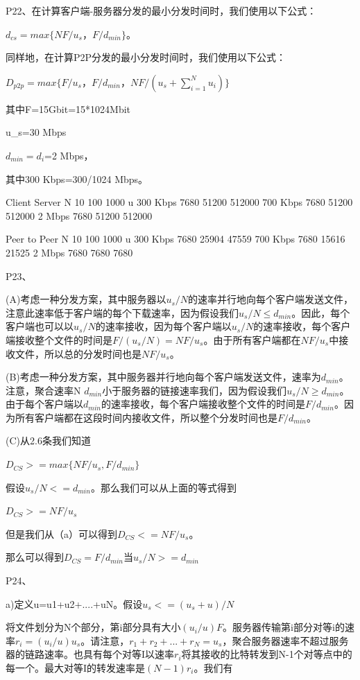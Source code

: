 \documentclass[11pt,UTF8,twoside]{article}
\begin{document}
	P22、在计算客户端-服务器分发的最小分发时间时，我们使用以下公式：
	
	$d_{cs}=max\{NF/u_s，F/d_{min}\}$。
	
	同样地，在计算P2P分发的最小分发时间时，我们使用以下公式：
	
	$D_{p2p}=max\{F/u_s，F/d_{min}，NF/(u_s+\sum_{i=1}^{N}u_i)\}$
	
	其中F=15Gbit=15*1024Mbit 
	
	u_s=30 Mbps 
	
	$d_{min}=d_i$=2 Mbps，
	
	其中300 Kbps=300/1024 Mbps。
	
	Client Server 
	N 
	10 100 1000 
	u 
	300 Kbps 7680 51200 512000 
	700 Kbps 7680 51200 512000 
	2 Mbps 7680 51200 512000 
	
	Peer to Peer 
	N 
	10 100 1000 
	u 
	300 Kbps 7680 25904 47559 
	700 Kbps 7680 15616 21525 
	2 Mbps 7680 7680 7680 
	
	
	P23、
	
	(A)考虑一种分发方案，其中服务器以$u_s/N$的速率并行地向每个客户端发送文件，注意此速率低于客户端的每个下载速率，因为假设我们$u_s/N≤d_{min}$。因此，每个客户端也可以以$u_s/N$的速率接收，因为每个客户端以$u_s/N$的速率接收，每个客户端接收整个文件的时间是$F/(u_s/N)=NF/u_s$。由于所有客户端都在$NF/u_s$中接收文件，所以总的分发时间也是$NF/u_s$。
	
	(B)考虑一种分发方案，其中服务器并行地向每个客户端发送文件，速率为$d_{min}$。注意，聚合速率N $d_{min}$小于服务器的链接速率我们，因为假设我们$u_s/N≥d_{min}$。由于每个客户端以$d_{min}$的速率接收，每个客户端接收整个文件的时间是$F/d_{min}$。因为所有客户端都在这段时间内接收文件，所以整个分发时间也是$F/d_{min}$。
	
	(C)从2.6条我们知道
	
	$D_{CS}>=max\{NF/u_s,F/d_{min}\}$
	
	假设$u_s/N<=d_{min}$。那么我们可以从上面的等式得到
	
	$D_{CS}>=NF/u_s$
	
	但是我们从（a）可以得到$D_{CS}<=NF/u_s$。
	
	那么可以得到$D_{CS}=F/d_{min} 当u_s/N>=d_{min}$
	
	P24、
	
	a)定义u=u1+u2+....+uN。假设$u_s<=(u_s+u)/N$
	
	将文件划分为N个部分，第i部分具有大小$(u_i/u)F$。服务器传输第i部分对等i的速率$r_i=(u_i/u)u_s$。请注意，$r_1+r_2+...+r_N=u_s$，聚合服务器速率不超过服务器的链路速率。也具有每个对等I以速率$r_i$将其接收的比特转发到N-1个对等点中的每一个。最大对等I的转发速率是$(N-1)r_i$。我们有
	
\end{document}
